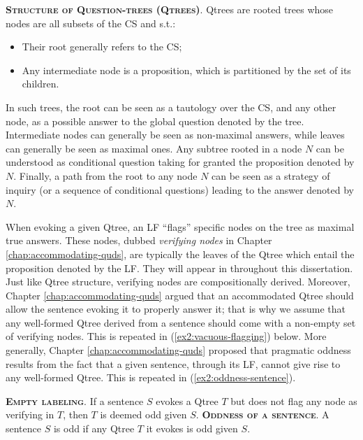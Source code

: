\begin{exe}
	 {\textsc{\textbf{Structure of Question-trees (Qtrees)}}. Qtrees are rooted trees whose nodes are all subsets of the CS and s.t.:
		\begin{itemize}
			\item Their root generally refers to the CS;
			\item Any intermediate node is a proposition, which is partitioned by the set of its children.
		\end{itemize}
	}
\end{exe}

In such trees, the root can be seen as a tautology over the CS, and any other node, as a possible answer to the global question denoted by the tree. Intermediate nodes can generally be seen as non-maximal answers, while leaves can generally be seen as maximal ones. Any subtree rooted in a node $N$ can be understood as conditional question taking for granted the proposition denoted by $N$. Finally, a path from the root to any node $N$ can be seen as a strategy of inquiry (or a sequence of conditional questions) leading to the answer denoted by $N$.



When evoking a given Qtree, an LF ``flags'' specific nodes on the tree as maximal true answers. These nodes, dubbed \textit{verifying nodes} in Chapter \ref{chap:accommodating-quds}, are typically the leaves of the Qtree which entail the proposition denoted by the LF. They will appear in \setlength{\fboxsep}{1pt} throughout this dissertation. Just like Qtree structure, verifying nodes are compositionally derived. Moreover, Chapter \ref{chap:accommodating-quds} argued that an accommodated Qtree should allow the sentence evoking it to properly answer it; that is why we assume that any well-formed Qtree derived from a sentence should come with a non-empty set of verifying nodes. This is repeated in (\ref{ex2:vacuous-flagging}) below. More generally, Chapter \ref{chap:accommodating-quds} proposed that pragmatic oddness results from the fact that a given sentence, through its LF, cannot give rise to any well-formed Qtree. This is repeated in (\ref{ex2:oddness-sentence}).


\begin{exe}
	 {\textsc{\textbf{Empty labeling}}. If a sentence $S$ evokes a Qtree $T$ but does not flag any node as verifying in $T$, then $T$ is deemed odd given $S$.}
	 {\textsc{\textbf{Oddness of a sentence}}. A sentence $S$ is odd if any Qtree $T$ it evokes is odd given $S$.}
\end{exe}

